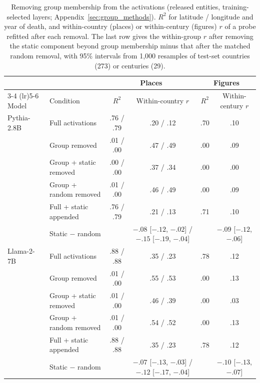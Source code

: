 \documentclass[11pt]{article}
\begin{document}
\begin{table}[t]
  \centering
  \caption{Removing group membership from the activations (released entities, training-selected
  layers; Appendix~\ref{sec:group_methods}). $R^2$ for latitude / longitude and year of
  death, and within-country (places) or within-century (figures) $r$ of a probe refitted
  after each removal. The last row gives the within-group $r$ after removing the static
  component beyond group membership minus that after the matched random removal, with 95\%
  intervals from 1{,}000 resamples of test-set countries (273) or centuries (29).}
  \label{tab:groupremoval}
  \footnotesize
  \setlength{\tabcolsep}{4pt}
  \begin{tabular}{llcccc}
    \toprule
    & & \multicolumn{2}{c}{Places} & \multicolumn{2}{c}{Figures} \\
    \cmidrule(lr){3-4} \cmidrule(lr){5-6}
    Model & Condition & $R^2$ & Within-country $r$ & $R^2$ & Within-century $r$ \\
    \midrule
    Pythia-2.8B & Full activations             & .76 / .79 & .20 / .12 & .70 & .10 \\
                & Group removed                & .01 / .00 & .47 / .49 & .00 & .09 \\
                & Group + static removed       & .00 / .00 & .37 / .34 & .00 & .00 \\
                & Group + random removed       & .01 / .00 & .46 / .49 & .00 & .09 \\
                & Full + static appended       & .76 / .79 & .21 / .13 & .71 & .10 \\
                & Static $-$ random            & & $-.08$ [$-.12$, $-.02$] / $-.15$ [$-.19$, $-.04$] & & $-.09$ [$-.12$, $-.06$] \\
    \midrule
    Llama-2-7B  & Full activations             & .88 / .88 & .35 / .23 & .78 & .12 \\
                & Group removed                & .01 / .00 & .55 / .53 & .00 & .13 \\
                & Group + static removed       & .01 / .00 & .46 / .39 & .00 & .03 \\
                & Group + random removed       & .01 / .00 & .54 / .52 & .00 & .13 \\
                & Full + static appended       & .88 / .88 & .35 / .23 & .78 & .12 \\
                & Static $-$ random            & & $-.07$ [$-.13$, $-.03$] / $-.12$ [$-.17$, $-.04$] & & $-.10$ [$-.13$, $-.07$] \\
    \bottomrule
  \end{tabular}
\end{table}
\end{document}
